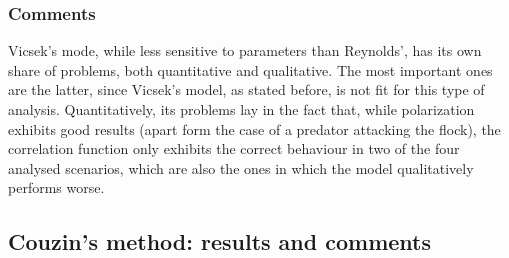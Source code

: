 \subsubsection{Comments}
Vicsek's mode, while less sensitive to parameters than Reynolds', has its own share of problems, both quantitative and qualitative. The most important ones are the latter, since Vicsek's model, as stated before, is not fit for this type of analysis. Quantitatively, its problems lay in the fact that, while polarization exhibits good results (apart form the case of a predator attacking the flock), the correlation function only exhibits the correct behaviour in two of the four analysed scenarios, which are also the ones in which the model qualitatively performs worse.
\subsection{Couzin's method: results and comments}
